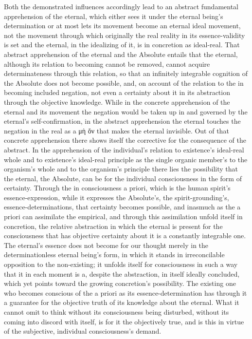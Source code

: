 \documentclass[12pt,a4paper]{book}
\begin{document}
Both the demonstrated influences accordingly lead to an abstract fundamental apprehension of the
eternal, which either sees it under the eternal being's determination or at most lets its movement
become an eternal ideal movement, not the movement through which originally the real reality in its
essence-validity is set and the eternal, in the idealizing of it, is in concretion as ideal-real. That
abstract apprehension of the eternal and the Absolute entails that the eternal, although its relation
to becoming cannot be removed, cannot acquire determinateness through this relation, so that an
infinitely integrable cognition of the Absolute does not become possible, and, on account of the
relation to the in becoming included negation, not even a certainty about it in its abstraction
through the objective knowledge. While in the concrete apprehension of the eternal and its movement
the negation would be taken up in and governed by the eternal's self-confirmation, in the abstract
apprehension the eternal touches the negation in the real as a μὴ ὄν that makes the eternal invisible.
Out of that concrete apprehension there shows itself the corrective for the consequence of the
abstract. In the apprehension of the individual's relation to existence's ideal-real whole and to
existence's ideal-real principle as the single organic member's to the organism's whole and to the
organism's principle there lies the possibility that the eternal, the Absolute, can be for the
individual consciousness in the form of certainty. Through the in consciousness a priori, which is the
human spirit's essence-expression, while it expresses the Absolute's, the spirit-grounding's,
essence-determinations, that certainty becomes possible, and inasmuch as the a priori can assimilate
the empirical, and through this assimilation unfold itself in concretion, the relative abstraction in
which the eternal is present for the consciousness that has objective certainty about it is a constantly
integrable one. The eternal's essence does not become for our thought merely in the determinationless
eternal being's form, in which it stands in irreconcilable opposition to the non-existing; it unfolds
itself for consciousness in such a way that it in each moment is a, despite the abstraction, in itself
ideally concluded, which yet points toward the growing concretion's possibility. The existing one who
becomes conscious of the a priori as its essence-determination has through it a guarantee for the
objective truth of its knowledge about the eternal. What it cannot omit to think without its
consciousness being disturbed, without its coming into discord with itself, is for it the objectively
true, and is this in virtue of the subjective, individual consciousness's demand.
\end{document}
